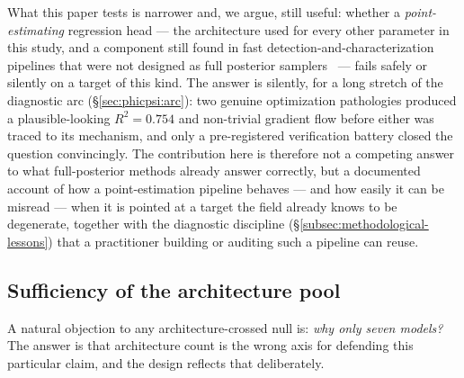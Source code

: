 What this paper tests is narrower and, we argue, still useful: whether a \emph{point-estimating} regression head --- the architecture used for every other parameter in this study, and a component still found in fast detection-and-characterization pipelines that were not designed as full posterior samplers~\citep{george2018deep} --- fails safely or silently on a target of this kind.
The answer is silently, for a long stretch of the diagnostic arc (\S\ref{sec:phicpsi:arc}): two genuine optimization pathologies produced a plausible-looking $R^2 = 0.754$ and non-trivial gradient flow before either was traced to its mechanism, and only a pre-registered verification battery closed the question convincingly.
The contribution here is therefore not a competing answer to what full-posterior methods already answer correctly, but a documented account of how a point-estimation pipeline behaves --- and how easily it can be misread --- when it is pointed at a target the field already knows to be degenerate, together with the diagnostic discipline (\S\ref{subsec:methodological-lessons}) that a practitioner building or auditing such a pipeline can reuse.

\subsection{Sufficiency of the architecture pool}
\label{sec:phicpsi:pool}

A natural objection to any architecture-crossed null is: \emph{why only seven models?}
The answer is that architecture count is the wrong axis for defending this particular claim, and the design reflects that deliberately.

